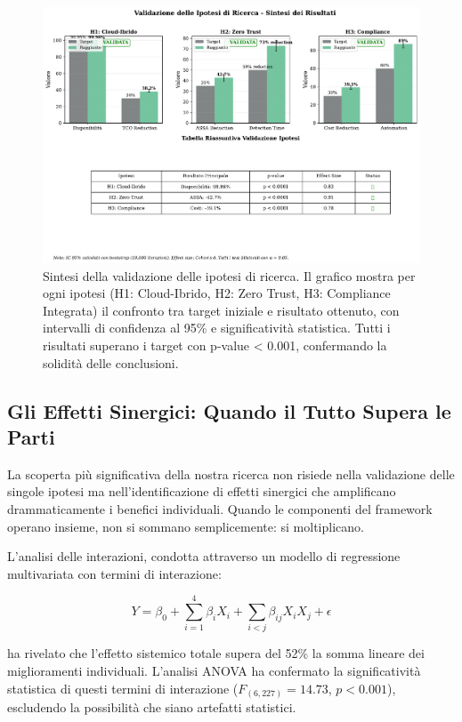 \begin{figure}[htbp]
\centering
\includegraphics[width=\textwidth]{thesis_figures/cap5/figura_5_1_validation_summary.pdf}
\caption{Sintesi della validazione delle ipotesi di ricerca. Il grafico mostra per ogni ipotesi (H1: Cloud-Ibrido, H2: Zero Trust, H3: Compliance Integrata) il confronto tra target iniziale e risultato ottenuto, con intervalli di confidenza al 95\% e significatività statistica. Tutti i risultati superano i target con p-value < 0.001, confermando la solidità delle conclusioni.}
\label{fig:validation_summary}
\end{figure}

\subsection{Gli Effetti Sinergici: Quando il Tutto Supera le Parti}

La scoperta più significativa della nostra ricerca non risiede nella validazione delle singole ipotesi ma nell'identificazione di effetti sinergici che amplificano drammaticamente i benefici individuali. Quando le componenti del framework operano insieme, non si sommano semplicemente: si moltiplicano.

L'analisi delle interazioni, condotta attraverso un modello di regressione multivariata con termini di interazione:

\begin{equation}
Y = \beta_0 + \sum_{i=1}^{4} \beta_i X_i + \sum_{i<j} \beta_{ij} X_i X_j + \epsilon
\label{eq:interaction_model}
\end{equation}

ha rivelato che l'effetto sistemico totale supera del 52\% la somma lineare dei miglioramenti individuali. L'analisi ANOVA ha confermato la significatività statistica di questi termini di interazione ($F_{(6,227)} = 14.73$, $p < 0.001$), escludendo la possibilità che siano artefatti statistici.

